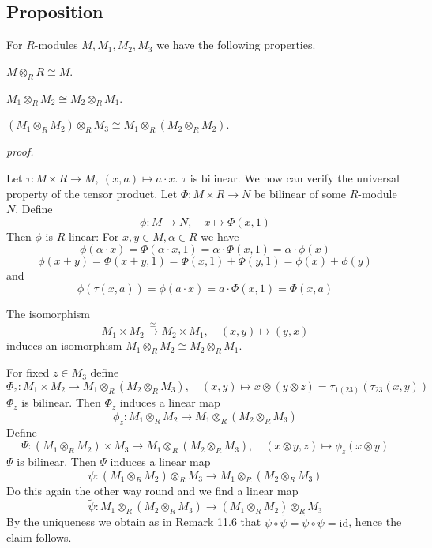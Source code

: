 \documentclass[12pt]{book}
\begin{document}
\begin{spacing}{1.3}
\subsection{Proposition} %
For $R$-modules $M, M_1, M_2, M_3$ we have the following properties.
\begin{compactenum}
\item $M \otimes_R R \cong M$.
\item $M_1 \otimes_R M_2 \cong M_2 \otimes_R M_1$.
\item $\left(M_1 \otimes_R M_2 \right) \otimes_R M_3 \cong M_1 \otimes_R \left(M_2 \otimes_R M_2 \right)$.
\end{compactenum}
\textit{proof.}
\begin{compactenum}
\item Let $\tau: M \times R \longrightarrow M, \ (x,a) \mapsto a \cdot x$.
$\tau$ is bilinear. We now can verify the universal property of the tensor product.
Let 
$\Phi: M \times R \longrightarrow N$
be bilinear of some $R$-module $N$. Define
$$\phi: M \longrightarrow N, \quad x \mapsto \Phi(x,1)$$
Then $\phi$ is $R$-linear: For $x,y \in M, \alpha \in R$ we have 
$$\phi(\alpha \cdot x)= \Phi(\alpha \cdot x,1)= \alpha \cdot \Phi(x,1)= \alpha \cdot \phi(x)$$
$$\phi(x+y)= \Phi(x+y,1)= \Phi(x,1)+ \Phi(y,1)= \phi(x)+\phi(y)$$
and
$$\phi\left(\tau(x,a)\right)= \phi(a\cdot x)=a \cdot \Phi(x,1)= \Phi(x,a)$$
\item The isomorphism 
$$M_1 \times M_2 \overset{\cong}{\longrightarrow} M_2 \times M_1, \quad (x,y) \mapsto (y,x)$$
induces an isomorphism $M_1 \otimes_R M_2 \cong M_2 \otimes_R M_1$.
\item For fixed $z \in M_3$ define
$$\Phi_z: M_1 \times M_2 \longrightarrow M_1 \otimes_R \left(M_2 \otimes_R M_3 \right), \quad (x,y) \mapsto x \otimes (y \otimes z)=\tau_{1(23)}\left(\tau_{23}(x,y)\right)$$
$\Phi_z$ is bilinear. Then $\Phi_z$ induces a linear map
$$\phi_z: M_1 \otimes_R M_2 \longrightarrow M_1 \otimes_R \left(M_2 \otimes_R M_3 \right)$$
Define
$$\Psi: \left(M_1 \otimes_R M_2 \right) \times M_3 \longrightarrow M_1 \otimes_R \left(M_2 \otimes_R M_3 \right), \quad (x \otimes y, z) \mapsto \phi_z(x \otimes y)$$
$\Psi$ is bilinear. Then $\Psi$ induces a linear map
$$\psi: \left(M_1 \otimes_R M_2\right) \otimes_R M_3 \longrightarrow M_1 \otimes_R \left(M_2 \otimes_R M_3 \right)$$
Do this again the other way round and we find a linear map
$$\tilde{\psi}: M_1 \otimes_R \left(M_2 \otimes_R M_3 \right) \longrightarrow \left(M_1 \otimes_R M_2\right) \otimes_R M_3$$
By the uniqueness we obtain as in Remark 11.6 that $\psi \circ \tilde{\psi} = \tilde{\psi} \circ \psi = \textrm{id}$, hence the claim follows.
\end{compactenum}


\end{spacing}
\end{document}
